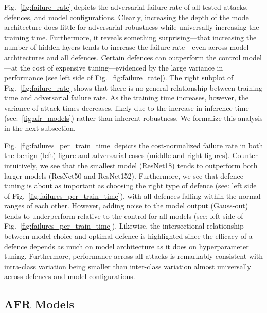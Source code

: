 Fig.~\ref{fig:failure_rate} depicts the adversarial failure rate of all tested attacks, defences, and model configurations. Clearly, increasing the depth of the model architecture does little for adversarial robustness while universally increasing the training time. Furthermore, it reveals something surprising---that increasing the number of hidden layers tends to increase the failure rate---even across model architectures and all defences. Certain defences can outperform the control model---at the cost of expensive tuning---evidenced by the large variance in performance (see left side of Fig.~\ref{fig:failure_rate}). The right subplot of Fig.~\ref{fig:failure_rate} shows that there is no general relationship between training time and adversarial failure rate.
As the training time increases, however, the variance of attack times decreases, likely due to the increase in inference time (see:~\ref{fig:afr_models}) rather than inherent robustness. We formalize this analysis  in the next subsection.



Fig.~\ref{fig:failures_per_train_time} depicts the cost-normalized failure rate in both the benign (left) figure and adversarial cases (middle and right figures). Counter-intuitively, we see that the smallest model (ResNet18) tends to outperform both larger models (ResNet50 and ResNet152). Furthermore, we see that defence tuning is about as important as choosing the right type of defence (see: left side of Fig.~\ref{fig:failures_per_train_time}), with all defences falling within the normal ranges of each other. However, adding noise to the model output (Gauss-out) tends to underperform relative to the control for all models (see: left side of Fig.~\ref{fig:failures_per_train_time}). Likewise, the intersectional relationship between model choice and optimal defence is highlighted since the efficacy of a defence depends as much on model architecture as it does on hyperparameter tuning.  Furthermore, performance across all attacks is remarkably consistent with intra-class variation being smaller than inter-class variation almost universally across defences and model configurations.



\subsection{AFR Models}

